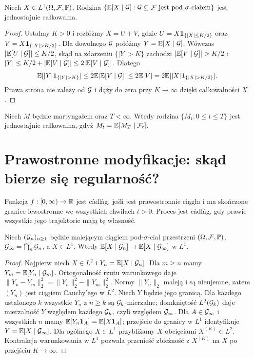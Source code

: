 \begin{lemat}
Niech $X\in L^1(\Omega,\mathcal{F},\mathbb{P})$. Rodzina
$\{\mathbb{E}[X\mid\mathcal{G}]:\mathcal{G}\subseteq\mathcal{F}\text{ jest pod-}\sigma\text{-ciałem}\}$
jest jednostajnie całkowalna.
\end{lemat}
\begin{proof}
Ustalmy $K>0$ i rozłóżmy $X=U+V$, gdzie
$U=X\mathbf{1}_{\{|X|\le K/2\}}$ oraz
$V=X\ind{\{|X|>K/2\}}$. Dla dowolnego $\mathcal{G}$
połóżmy $Y=\mathbb{E}[X\mid\mathcal{G}]$. Wówczas
$|\mathbb{E}[U\mid\mathcal{G}]|\le K/2$, skąd na zdarzeniu
$\{|Y|>K\}$ zachodzi $|\E[V\mid\calG]|>K/2$
i $|Y|\le K/2+|\mathbb{E}[V\mid\mathcal{G}]|\le2|\mathbb{E}[V\mid\mathcal{G}]|$.
Dlatego
\[
\E[|Y|\ind{\{|Y|>K\}}]
\le2\E|\E[V\mid\calG]|
\le2\E|V|
=2\E[|X|\ind{\{|X|>K/2\}}].
\]
Prawa strona nie zależy od $\mathcal{G}$ i dąży do zera
przy $K\to\infty$ dzięki całkowalności $X$.
\end{proof}

\begin{wniosek}
Niech $M$ będzie martyngałem oraz $T<\infty$.
Wtedy rodzina $\{M_t:0\le t\le T\}$ jest jednostajnie
całkowalna, gdyż $M_t=\mathbb{E}[M_T\mid\mathcal{F}_t]$.
\end{wniosek}

\section{Prawostronne modyfikacje: skąd bierze się regularność?}
\begin{definicja}
Funkcja $f:[0,\infty)\to\mathbb{R}$ jest c\`adl\`ag, jeśli
jest prawostronnie ciągła i ma skończone granice lewostronne
we wszystkich chwilach $t>0$. Proces jest c\`adl\`ag,
gdy prawie wszystkie jego trajektorie mają tę własność.
\end{definicja}

\begin{lemat}
Niech $(\mathcal{G}_n)_{n\ge1}$ będzie malejącym ciągiem
pod-$\sigma$-ciał przestrzeni $(\Omega,\mathcal{F},\mathbb{P})$,
$\mathcal{G}_\infty=\bigcap_n\mathcal{G}_n$, a $X\in L^1$.
Wtedy
$\mathbb{E}[X\mid\mathcal{G}_n]\to\mathbb{E}[X\mid\mathcal{G}_\infty]$ w $L^1$.
\end{lemat}
\begin{proof}
Najpierw niech $X\in L^2$ i $Y_n=\mathbb{E}[X\mid\mathcal{G}_n]$.
Dla $m\ge n$ mamy $Y_m=\mathbb{E}[Y_n\mid\mathcal{G}_m]$.
Ortogonalność rzutu warunkowego daje
$\|Y_n-Y_m\|_2^2=\|Y_n\|_2^2-\|Y_m\|_2^2$.
Normy $\|Y_n\|_2$ maleją i są nieujemne, zatem
$(Y_n)$ jest ciągiem Cauchy'ego w $L^2$. Niech $Y$
będzie jego granicą. Dla każdego ustalonego $k$ wszystkie
$Y_n$ z $n\ge k$ są $\mathcal{G}_k$-mierzalne; domkniętość
$L^2(\mathcal{G}_k)$ daje mierzalność $Y$ względem każdego
$\mathcal{G}_k$, czyli względem $\mathcal{G}_\infty$.
Dla $A\in\mathcal{G}_\infty$ i wszystkich $n$ mamy
$\mathbb{E}[Y_n\mathbf{1}_{A}]=\mathbb{E}[X\mathbf{1}_{A}]$; przejście do granicy
w $L^1$ identyfikuje $Y=\mathbb{E}[X\mid\mathcal{G}_\infty]$.
Dla ogólnego $X\in L^1$ przybliżamy $X$ obcięciami
$X^{(K)}\in L^2$. Kontrakcja warunkowania w $L^1$
pozwala przenieść zbieżność z $X^{(K)}$ na $X$ po
przejściu $K\to\infty$.
\end{proof}

